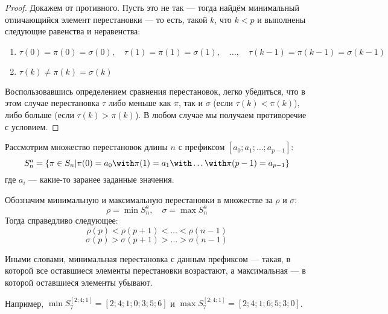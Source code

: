 \documentclass[12pt,a4paper,oneside]{article}
\begin{document}
\begin{proof}
Докажем от противного. Пусть это не так --- тогда найдём минимальный
отличающийся элемент перестановки --- то есть, такой $k$, что $k<p$ и выполнены 
следующие равенства и неравенства:
\begin{enumerate}
\item $\tau(0) = \pi(0) = \sigma(0),\quad \tau(1) = \pi(1) =\sigma(1),\quad\dots,\quad \tau(k-1) = \pi(k-1) = \sigma(k-1)$
\item $\tau(k)\ne\pi(k)=\sigma(k)$
\end{enumerate}
Воспользовавшись определением сравнения перестановок, легко убедиться, 
что в этом случае перестановка $\tau$ либо меньше как
$\pi$, так и $\sigma$ (если $\tau(k) < \pi(k)$), либо больше 
(если $\tau(k) > \pi(k)$). В любом случае мы получаем противоречие с условием.
\end{proof}


\begin{lemma}\label{order}
Рассмотрим множество перестановок длины $n$ с префиксом $[a_0; a_1; \dots; a_{p-1}]$:
$$S^a_n = \{\pi\in S_n | \pi(0)=a_0 \with \pi(1)=a_1 \with\dots\with \pi(p-1)=a_{p-1}\}$$
где $a_i$ --- какие-то заранее заданные значения.

Обозначим минимальную и максимальную перестановки в множестве за $\rho$ и $\sigma$:
$$\rho = \min S^a_n, \quad \sigma = \max S^a_n$$
Тогда справедливо следующее:
$$\rho(p) < \rho(p+1) < \dots < \rho(n-1)$$
$$\sigma(p) > \sigma(p+1) > \dots > \sigma(n-1)$$
\end{lemma}

\noindent Иными словами, минимальная перестановка с данным префиксом --- такая,
в которой все оставшиеся элементы перестановки возрастают, 
а максимальная --- в которой оставшиеся элементы убывают.

Например, $\min S^{[2;4;1]}_7 = [2;4;1;0;3;5;6]$ и $\max S^{[2;4;1]}_7 = [2;4;1;6;5;3;0]$.
\end{document}
